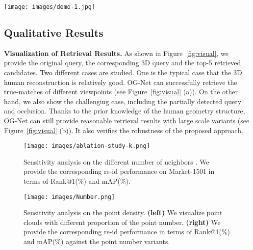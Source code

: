 \documentclass[journal]{IEEEtran}
\begin{document}
\begin{figure*}[t]
\begin{center}
     \texttt{[image: images/demo-1.jpg]}
\end{center} \caption{ Visualization of Retrieval Results. \textbf{(a)} Given one 3D query, we show the original 2D images and the top-5 retrieval results. \textbf{(b)} We also show the challenging case, such as occlusion and the partially detected query. The \textcolor{OliveGreen}{green} index indicates the true-matches, while the \textcolor{red}{red} index denotes the false-matches.  }
      \label{fig:visual}
\end{figure*}

\subsection{Qualitative Results}
\noindent\textbf{Visualization of Retrieval Results.}
As shown in Figure~\ref{fig:visual}, we provide the original query, the corresponding 3D query and the top-5 retrieved candidates. Two different cases are studied. One is the typical case that the 3D human reconstruction is relatively good. OG-Net can successfully retrieve the true-matches of different viewpoints (see Figure~\ref{fig:visual} (a)). On the other hand, we also show the challenging case, including the partially detected query and occlusion. Thanks to the prior knowledge of the human geometry structure, OG-Net can still provide reasonable retrieval results with large scale variants (see Figure~\ref{fig:visual} (b)). It also verifies the robustness of the proposed approach.

\begin{figure}[t]{
\caption{Sensitivity analysis on the different number of neighbors . We provide the corresponding re-id performance on Market-1501 in terms of Rank@1(\%) and mAP(\%).  }\label{fig:ablation_k}
{\texttt{[image: images/ablation-study-k.png]}}}\end{figure}


\begin{figure}[t]{
\caption{Sensitivity analysis on the point density. \textbf{(left)} We visualize point clouds with different proportion of the point number. \textbf{(right)} We provide the corresponding re-id performance in terms of Rank@1(\%) and mAP(\%) against the point number variants.  }\label{fig:sample_num}
{\texttt{[image: images/Number.png]}}}\end{figure}
\end{document}
